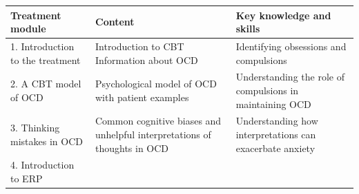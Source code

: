\documentclass[]{book}
\begin{document}
\begin{longtable}[]{@{}lll@{}}
\toprule
\begin{minipage}[b]{0.30\columnwidth}\raggedright
\textbf{Treatment module}\strut
\end{minipage} & \begin{minipage}[b]{0.30\columnwidth}\raggedright
\textbf{Content}\strut
\end{minipage} & \begin{minipage}[b]{0.30\columnwidth}\raggedright
\textbf{Key knowledge and skills}\strut
\end{minipage}\tabularnewline
\midrule
\endhead
\begin{minipage}[t]{0.30\columnwidth}\raggedright
1. Introduction to the treatment\strut
\end{minipage} & \begin{minipage}[t]{0.30\columnwidth}\raggedright
Introduction to CBT Information about OCD\strut
\end{minipage} & \begin{minipage}[t]{0.30\columnwidth}\raggedright
Identifying obsessions and compulsions\strut
\end{minipage}\tabularnewline
\begin{minipage}[t]{0.30\columnwidth}\raggedright
2. A CBT model of OCD\strut
\end{minipage} & \begin{minipage}[t]{0.30\columnwidth}\raggedright
Psychological model of OCD with patient examples\strut
\end{minipage} & \begin{minipage}[t]{0.30\columnwidth}\raggedright
Understanding the role of compulsions in maintaining OCD\strut
\end{minipage}\tabularnewline
\begin{minipage}[t]{0.30\columnwidth}\raggedright
3. Thinking mistakes in OCD\strut
\end{minipage} & \begin{minipage}[t]{0.30\columnwidth}\raggedright
Common cognitive biases and unhelpful interpretations of thoughts in OCD\strut
\end{minipage} & \begin{minipage}[t]{0.30\columnwidth}\raggedright
Understanding how interpretations can exacerbate anxiety\strut
\end{minipage}\tabularnewline
\begin{minipage}[t]{0.30\columnwidth}\raggedright
4. Introduction to ERP\strut
\end{minipage} & \begin{minipage}[t]{0.30\columnwidth}\raggedright

\end{minipage}
\end{longtable}
\end{document}
